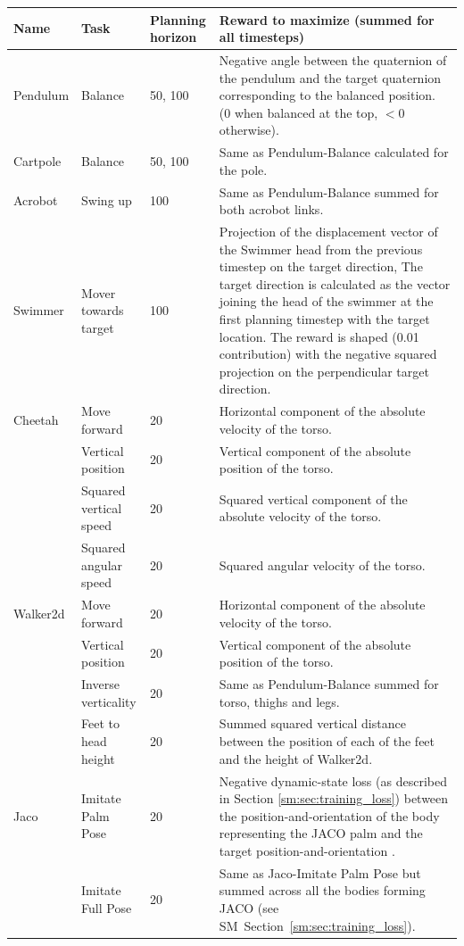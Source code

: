 \vskip 0.15in
\begin{center}
\begin{small}
\renewcommand{\arraystretch}{1.5}
\begin{tabular}{p{15mm}p{30mm}p{15mm}p{90mm}}
\toprule
 Name & Task & Planning \newline horizon & Reward to maximize (summed for all timesteps) \\
\midrule
Pendulum  & Balance & 50, 100 & Negative angle between the quaternion of the pendulum and the target quaternion corresponding to the balanced position. (0 when balanced at the top, $<0$ otherwise).
\\
Cartpole  & Balance & 50, 100 & Same as Pendulum-Balance calculated for the pole.\\
Acrobot   & Swing up & 100 & Same as Pendulum-Balance summed for both acrobot links.\\
Swimmer   & Mover towards target & 100 & Projection of the displacement vector of the Swimmer head from the previous timestep on the target direction, The target direction is calculated as the vector joining the head of the swimmer at the first planning timestep with the target location. The reward is shaped (0.01 contribution) with the negative squared projection on the perpendicular target direction.\\
Cheetah   & Move forward & 20 & Horizontal component of the absolute velocity of the torso.\\
   & Vertical position & 20 & Vertical component of the absolute position of the torso.\\
   & Squared vertical speed &20 & Squared vertical component of the absolute velocity of the torso.\\
   & Squared angular speed & 20& Squared angular velocity of the torso.\\
Walker2d   & Move forward &20 & Horizontal component of the absolute velocity of the torso.\\
   & Vertical position &20 & Vertical component of the absolute position of the torso.\\
   & Inverse verticality &20& Same as Pendulum-Balance summed for torso, thighs and legs.\\
   & Feet to head height &20& Summed squared vertical distance between the position of each of the feet and the height of Walker2d.\\
Jaco      & Imitate Palm Pose &20& Negative dynamic-state loss (as described in Section \ref{sm:sec:training_loss}) between the position-and-orientation of the body representing the JACO palm and the target position-and-orientation .\\
  & Imitate Full Pose &20& Same as Jaco-Imitate Palm Pose but summed across all the bodies forming JACO (see SM~Section~\ref{sm:sec:training_loss}).\\


\bottomrule
\end{tabular}
\end{small}
\end{center}
\vskip -0.1in
\renewcommand{\arraystretch}{1.}



